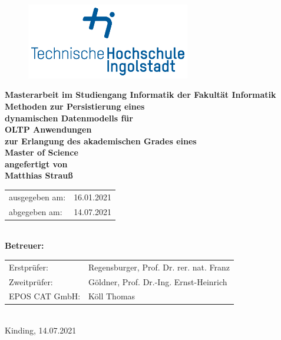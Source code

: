 \begin{titlepage}

\phantom{tmpText}

\vspace{1cm}

\begin{figure}[h!]
\centering

\includegraphics[height=3.3cm]{bilder/thi_logo}
\end{figure}

  \begin{center}

\vspace{1cm}
    
    
    \textbf{{\large Masterarbeit im Studiengang Informatik der Fakultät Informatik} \\[3ex]
    {\LARGE Methoden zur Persistierung eines \\ dynamischen Datenmodells für \\ OLTP Anwendungen}\\[4ex] 
    zur Erlangung des akademischen Grades eines \\
    Master of Science \\[2ex]
    \vfill
    angefertigt von 
     \\[2ex] Matthias Strauß
    }\\[5ex]
	\begin{tabularx}{\textwidth}{ @{} >{\RaggedLeft}p{6cm} X @{} }
      ausgegeben am: & 	16.01.2021 \\
      abgegeben am: & 14.07.2021 \\
    \end{tabularx} \\[2ex]   

    \vfill
   \textbf{Betreuer:} \\[5ex]
    \begin{tabularx}{\textwidth}{ @{} >{\RaggedLeft}p{6cm} X @{} }
      Erstprüfer: & Regensburger, Prof. Dr. rer. nat. Franz \\
      Zweitprüfer: & Göldner, Prof. Dr.-Ing. Ernst-Heinrich \\
      EPOS CAT GmbH: & Köll Thomas
    \end{tabularx} \\[2ex]
    \vfill
    Kinding, 14.07.2021
  \end{center}
\end{titlepage}
